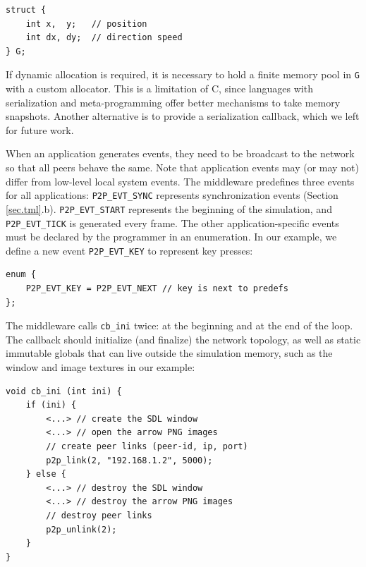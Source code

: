 \documentclass[12pt]{article}
\newcommand{\code}[1]  {\texttt{\small{#1}}}
\begin{document}
{\footnotesize
\begin{verbatim}
struct {
    int x,  y;   // position
    int dx, dy;  // direction speed
} G;
\end{verbatim}
}

If dynamic allocation is required, it is necessary to hold a finite memory
pool in \code{G} with a custom allocator.
This is a limitation of C, since languages with serialization and
meta-programming offer better mechanisms to take memory snapshots.
Another alternative is to provide a serialization callback, which we left for
future work.


When an application generates events, they need to be broadcast to the network
so that all peers behave the same.
Note that application events may (or may not) differ from low-level local
system events.
%
The middleware predefines three events for all applications:
    \code{P2P\_EVT\_SYNC} represents synchronization events
        (Section \ref{sec.tml}.b).
    \code{P2P\_EVT\_START} represents the beginning of the simulation, and
    \code{P2P\_EVT\_TICK} is generated every frame.
The other application-specific events must be declared by the programmer in an
enumeration.
In our example, we define a new event \code{P2P\_EVT\_KEY} to represent key
presses:

{\footnotesize
\begin{verbatim}
enum {
    P2P_EVT_KEY = P2P_EVT_NEXT // key is next to predefs
};
\end{verbatim}
}


The middleware calls \code{cb\_ini} twice: at the beginning and at the end of
the loop.
The callback should initialize (and finalize) the network topology, as well as
static immutable globals that can live outside the simulation memory, such as
the window and image textures in our example:

{\footnotesize
\begin{verbatim}
void cb_ini (int ini) {
    if (ini) {
        <...> // create the SDL window
        <...> // open the arrow PNG images
        // create peer links (peer-id, ip, port)
        p2p_link(2, "192.168.1.2", 5000);
    } else {
        <...> // destroy the SDL window
        <...> // destroy the arrow PNG images
        // destroy peer links
        p2p_unlink(2);
    }
}
\end{verbatim}
}
\end{document}
